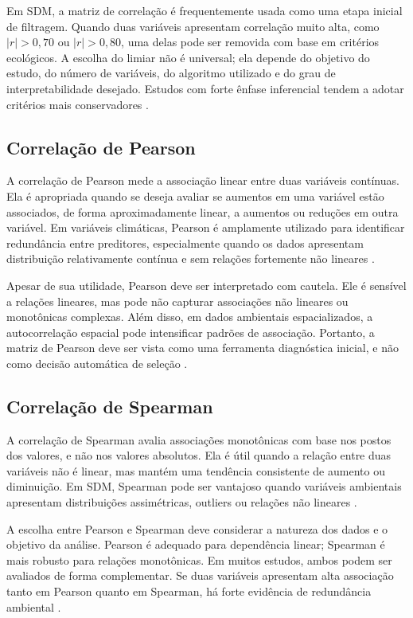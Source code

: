 Em SDM, a matriz de correlação é frequentemente usada como uma etapa inicial de filtragem. Quando duas variáveis apresentam correlação muito alta, como $|r| > 0{,}70$ ou $|r| > 0{,}80$, uma delas pode ser removida com base em critérios ecológicos. A escolha do limiar não é universal; ela depende do objetivo do estudo, do número de variáveis, do algoritmo utilizado e do grau de interpretabilidade desejado. Estudos com forte ênfase inferencial tendem a adotar critérios mais conservadores \parencite{dormann2013collinearity,guisan2017habitat}.

\subsection{Correlação de Pearson}

A correlação de Pearson mede a associação linear entre duas variáveis contínuas. Ela é apropriada quando se deseja avaliar se aumentos em uma variável estão associados, de forma aproximadamente linear, a aumentos ou reduções em outra variável. Em variáveis climáticas, Pearson é amplamente utilizado para identificar redundância entre preditores, especialmente quando os dados apresentam distribuição relativamente contínua e sem relações fortemente não lineares \parencite{dormann2013collinearity}.

Apesar de sua utilidade, Pearson deve ser interpretado com cautela. Ele é sensível a relações lineares, mas pode não capturar associações não lineares ou monotônicas complexas. Além disso, em dados ambientais espacializados, a autocorrelação espacial pode intensificar padrões de associação. Portanto, a matriz de Pearson deve ser vista como uma ferramenta diagnóstica inicial, e não como decisão automática de seleção \parencite{elith2009species,franklin2010mapping}.

\subsection{Correlação de Spearman}

A correlação de Spearman avalia associações monotônicas com base nos postos dos valores, e não nos valores absolutos. Ela é útil quando a relação entre duas variáveis não é linear, mas mantém uma tendência consistente de aumento ou diminuição. Em SDM, Spearman pode ser vantajoso quando variáveis ambientais apresentam distribuições assimétricas, outliers ou relações não lineares \parencite{dormann2013collinearity,guisan2017habitat}.

A escolha entre Pearson e Spearman deve considerar a natureza dos dados e o objetivo da análise. Pearson é adequado para dependência linear; Spearman é mais robusto para relações monotônicas. Em muitos estudos, ambos podem ser avaliados de forma complementar. Se duas variáveis apresentam alta associação tanto em Pearson quanto em Spearman, há forte evidência de redundância ambiental \parencite{dormann2013collinearity}.

